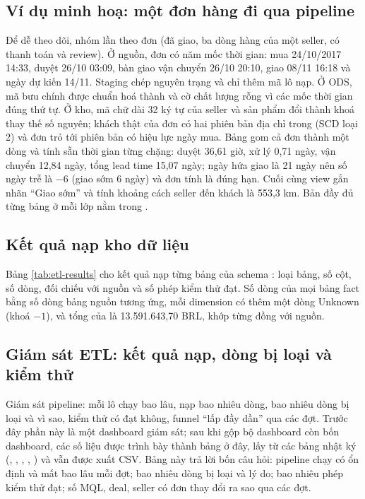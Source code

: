 \subsection{Ví dụ minh hoạ: một đơn hàng đi qua pipeline}\label{sec:etl-vi-du}
Để dễ theo dõi, nhóm lần theo đơn  (đã giao, ba dòng hàng của một seller, có thanh toán và review). Ở nguồn, đơn có năm mốc thời gian: mua 24/10/2017 14:33, duyệt 26/10 03:09, bàn giao vận chuyển 26/10 20:10, giao 08/11 16:18 và ngày dự kiến 14/11. Staging chép nguyên trạng và chỉ thêm mã lô nạp. Ở ODS, mã bưu chính  được chuẩn hoá thành  và cờ chất lượng  rỗng vì các mốc thời gian đúng thứ tự. Ở kho, mã chữ dài 32 ký tự của seller và sản phẩm đổi thành khoá thay thế số nguyên; khách thật của đơn có hai phiên bản địa chỉ trong  (SCD loại 2) và đơn trỏ tới phiên bản có hiệu lực ngày mua. Bảng  gom cả đơn thành một dòng và tính sẵn thời gian từng chặng: duyệt 36,61 giờ, xử lý 0,71 ngày, vận chuyển 12,84 ngày, tổng lead time 15,07 ngày; ngày hứa giao là 21 ngày nên số ngày trễ là $-6$ (giao sớm 6 ngày) và đơn tính là đúng hạn. Cuối cùng view  gắn nhãn ``Giao sớm'' và  tính khoảng cách seller đến khách là 553,3 km. Bản đầy đủ từng bảng ở mỗi lớp nằm trong .

\subsection{Kết quả nạp kho dữ liệu}\label{sec:etl-ket-qua}
Bảng \ref{tab:etl-results} cho kết quả nạp từng bảng của schema : loại bảng, số cột, số dòng, đối chiếu với nguồn và số phép kiểm thử đạt. Số dòng của mọi bảng fact bằng số dòng bảng nguồn tương ứng, mỗi dimension có thêm một dòng Unknown (khoá $-1$), và tổng  của  là 13.591.643,70 BRL, khớp từng đồng với nguồn.


\subsection{Giám sát ETL: kết quả nạp, dòng bị loại và kiểm thử}\label{sec:etl-giam-sat}
Giám sát pipeline: mỗi lô chạy bao lâu, nạp bao nhiêu dòng, bao nhiêu dòng bị loại và vì sao, kiểm thử có đạt không, funnel ``lấp đầy dần'' qua các đợt. Trước đây phần này là một dashboard giám sát; sau khi gộp bộ dashboard còn bốn dashboard, các số liệu được trình bày thành bảng ở đây, lấy từ các bảng nhật ký  (, , , , ) và vẫn được xuất CSV. Bảng này trả lời bốn câu hỏi: pipeline chạy có ổn định và mất bao lâu mỗi đợt; bao nhiêu dòng bị loại và lý do; bao nhiêu phép kiểm thử đạt; số MQL, deal, seller có đơn thay đổi ra sao qua các đợt.


